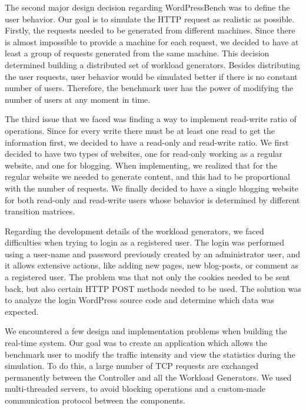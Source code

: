 The second major design decision regarding WordPressBench was to define the user behavior. Our goal is to simulate the HTTP request as realistic as possible. Firstly, the requests needed to be generated from different machines. Since there is almost impossible to provide a machine for each request, we decided to have at least a group of requests generated from the same machine. This decision determined building a distributed set of workload generators. Besides distributing the user requests, user behavior would be simulated better if there is no constant number of users. Therefore, the benchmark user has the power of modifying the number of users at any moment in time.

The third issue that we faced was finding a way to implement read-write ratio of operations. Since for every write there must be at least one read to get the information first, we decided to have a read-only and read-write ratio. We first decided to have two types of websites, one for read-only working as a regular website, and one for blogging. When implementing, we realized that for the regular website we needed to generate content, and this had to be proportional with the number of requests. We finally decided to have a single blogging website for both read-only and read-write users whose behavior is determined by different transition matrices.

Regarding the development details of the workload generators, we faced difficulties when trying to login as a registered user. The login was performed using a user-name and password previously created by an administrator user, and it allows extensive actions, like adding new pages, new blog-posts, or comment as a registered user. The problem was that not only the cookies needed to be sent back, but also certain HTTP POST methods needed to be used. The solution was to analyze the login WordPress source code and determine which data was expected. 

We encountered a few design and implementation problems when building the real-time system. Our goal was to create an application which allows the benchmark user to modify the traffic intensity and view the statistics during the simulation. To do this, a large number of TCP requests are exchanged permanently between the Controller and all the Workload Generators. We used multi-threaded servers, to avoid blocking operations and a custom-made communication protocol between the components.
